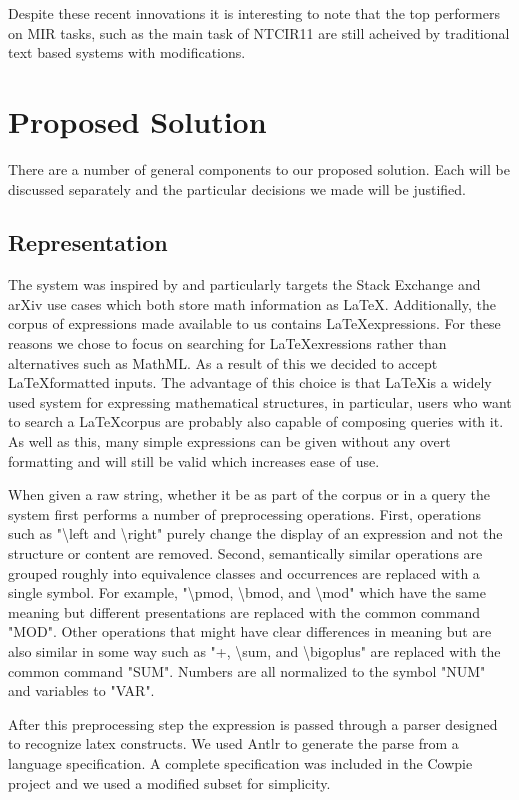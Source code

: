 \documentclass{sig-alternate}
\begin{document}
Despite these recent innovations it is interesting to note that the top performers on 
MIR tasks, such as the main task of NTCIR11 are still acheived by traditional text based
systems with modifications.

\section{Proposed Solution}
There are a number of general components to our proposed solution.
Each will be discussed separately and the particular 
decisions we made will be justified. 

\subsection{Representation}
The system was inspired by and particularly targets the Stack Exchange
and arXiv use cases which both store math information as LaTeX. 
Additionally, the corpus of expressions made available to us contains
\LaTeX expressions. For these reasons we chose to focus on searching
for \LaTeX exressions rather than alternatives such as MathML. As a 
result of this we decided to accept \LaTeX formatted inputs. The advantage
of this choice is that \LaTeX is a widely used system for expressing
mathematical structures, in particular, users who want to search
a \LaTeX corpus are probably also capable of composing queries with it.
As well as this, many simple expressions can be given without any 
overt formatting and will still be valid which increases ease of use.

When given a raw string, whether it be as part of the corpus or in 
a query the system first performs a number of preprocessing operations.
First, operations such as "\textbackslash left and \textbackslash right"
purely change the display of an expression and not the structure or
content are removed. Second, semantically similar operations are grouped roughly into equivalence classes and occurrences are replaced with a single symbol. For example, "\textbackslash pmod, \textbackslash bmod, and \textbackslash mod" which have the same meaning but different 
presentations are replaced with the common command "MOD". Other
operations that might have clear differences in meaning but are also
similar in some way such as "+, \textbackslash sum, and \textbackslash bigoplus" are replaced with the common command "SUM". Numbers are all normalized to the symbol "NUM" and variables to "VAR".

After this preprocessing step the expression is passed through a parser designed to recognize latex constructs. We used Antlr to generate the parse from a language specification. A complete specification was included in the Cowpie project and we used a modified subset for simplicity. 
\end{document}
